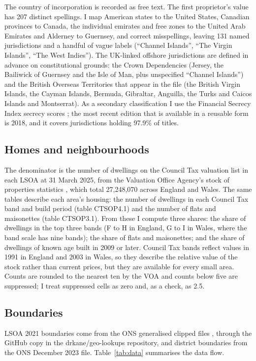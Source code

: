 \documentclass[11pt,a4paper]{article}
\begin{document}
The country of incorporation is recorded as free text. The first proprietor's value has 207 distinct spellings. I map American states to the United States, Canadian provinces to Canada, the individual emirates and free zones to the United Arab Emirates and Alderney to Guernsey, and correct misspellings, leaving 131 named jurisdictions and a handful of vague labels (``Channel Islands'', ``The Virgin Islands'', ``The West Indies''). The UK-linked offshore jurisdictions are defined in advance on constitutional grounds: the Crown Dependencies (Jersey, the Bailiwick of Guernsey and the Isle of Man, plus unspecified ``Channel Islands'') and the British Overseas Territories that appear in the file (the British Virgin Islands, the Cayman Islands, Bermuda, Gibraltar, Anguilla, the Turks and Caicos Islands and Montserrat). As a secondary classification I use the Financial Secrecy Index secrecy scores \citep{tjn2018}; the most recent edition that is available in a reusable form is 2018, and it covers jurisdictions holding 97.9\% of titles.

\subsection{Homes and neighbourhoods}
The denominator is the number of dwellings on the Council Tax valuation list in each LSOA at 31 March 2025, from the Valuation Office Agency's stock of properties statistics \citep{voa2025}, which total 27,248,070 across England and Wales. The same tables describe each area's housing: the number of dwellings in each Council Tax band and build period (table CTSOP4.1) and the number of flats and maisonettes (table CTSOP3.1). From these I compute three shares: the share of dwellings in the top three bands (F to H in England, G to I in Wales, where the band scale has nine bands); the share of flats and maisonettes; and the share of dwellings of known age built in 2009 or later. Council Tax bands reflect values in 1991 in England and 2003 in Wales, so they describe the relative value of the stock rather than current prices, but they are available for every small area. Counts are rounded to the nearest ten by the VOA and counts below five are suppressed; I treat suppressed cells as zero and, as a check, as 2.5.

\subsection{Boundaries}
LSOA 2021 boundaries come from the ONS generalised clipped files \citep{ons2021lsoa}, through the GitHub copy in the drkane/geo-lookups repository, and district boundaries from the ONS December 2023 file. Table~\ref{tab:data} summarises the data flow.
\end{document}

